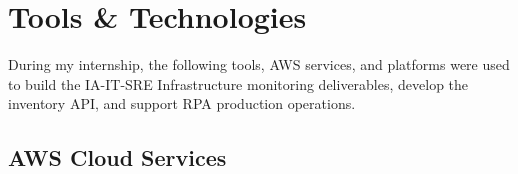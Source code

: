 
\chapter{Tools \& Technologies}
\label{chap:tools}

During my internship, the following tools, AWS services, and platforms
were used to build the IA-IT-SRE Infrastructure monitoring deliverables,
develop the inventory API, and support RPA production operations.

\section{AWS Cloud Services}
\label{sec:tools_aws}

